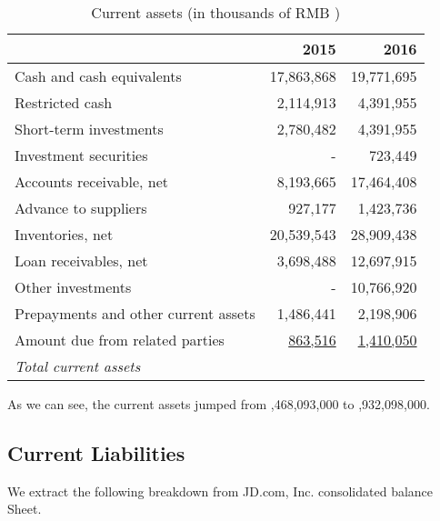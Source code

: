 \begin{table}[H]	
\begin{center}
	\begin{tabular}{lrr}
		\toprule
		&\textbf{2015}&\textbf{2016}\\
		\midrule
		Cash and cash equivalents&17,863,868&19,771,695\\
		Restricted cash&2,114,913&4,391,955\\
		Short-term investments&2,780,482&4,391,955\\
		Investment securities&-&723,449\\
		Accounts receivable, net&8,193,665&17,464,408\\
		Advance to suppliers&927,177&1,423,736\\
		Inventories, net&20,539,543&28,909,438\\
		Loan receivables, net&3,698,488&12,697,915\\
		Other investments&-&10,766,920\\
		Prepayments and other current assets&1,486,441&2,198,906\\
		Amount due from related parties&\underline{863,516}&\underline{1,410,050}\\
		\qquad\emph{Total current assets}&\uuline{58,468,093}&\uuline{106,932,098}\\
		\bottomrule
	\end{tabular}
\end{center}
	\caption{Current assets (in thousands of RMB \textyen)}\label{table:1}
\end{table}
As we can see, the current assets jumped from ,468,093,000 to ,932,098,000.

\subsection{Current Liabilities}

We extract the following breakdown from JD.com, Inc. consolidated balance Sheet.\\
 
